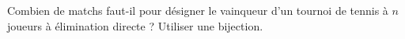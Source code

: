 Combien de matchs faut-il pour désigner le vainqueur d'un tournoi de tennis à $n$ joueurs à élimination directe ? Utiliser une bijection.

